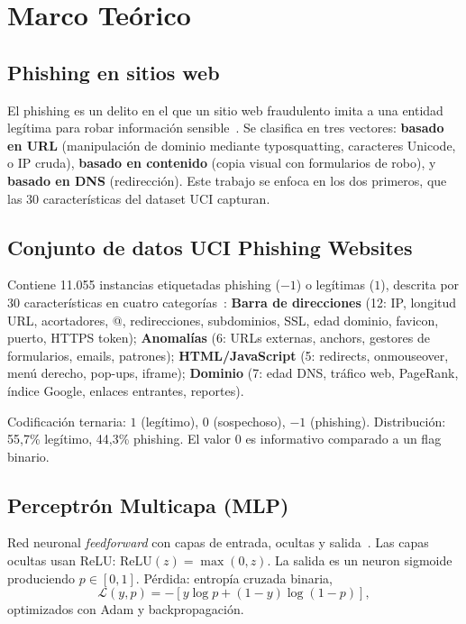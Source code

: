\documentclass[conference]{IEEEtran}
\begin{document}
\section{Marco Teórico}
\subsection{Phishing en sitios web}
El phishing es un delito en el que un sitio web fraudulento imita a una entidad legítima para robar información sensible~\cite{mohammad2012}. Se clasifica en tres vectores: \textbf{basado en URL} (manipulación de dominio mediante typosquatting, caracteres Unicode, o IP cruda), \textbf{basado en contenido} (copia visual con formularios de robo), y \textbf{basado en DNS} (redirección). Este trabajo se enfoca en los dos primeros, que las 30 características del dataset UCI capturan.

\subsection{Conjunto de datos UCI Phishing Websites}
Contiene 11.055 instancias etiquetadas phishing ($-1$) o legítimas ($1$), descrita por 30 características en cuatro categorías~\cite{mohammad2014}: \textbf{Barra de direcciones} (12: IP, longitud URL, acortadores, @, redirecciones, subdominios, SSL, edad dominio, favicon, puerto, HTTPS token); \textbf{Anomalías} (6: URLs externas, anchors, gestores de formularios, emails, patrones); \textbf{HTML/JavaScript} (5: redirects, onmouseover, menú derecho, pop-ups, iframe); \textbf{Dominio} (7: edad DNS, tráfico web, PageRank, índice Google, enlaces entrantes, reportes). 

Codificación ternaria: $1$ (legítimo), $0$ (sospechoso), $-1$ (phishing). Distribución: 55,7\% legítimo, 44,3\% phishing. El valor $0$ es informativo comparado a un flag binario.

\subsection{Perceptrón Multicapa (MLP)}
Red neuronal \textit{feedforward} con capas de entrada, ocultas y salida~\cite{lecun2015}. Las capas ocultas usan ReLU: $\text{ReLU}(z)=\max(0,z)$. La salida es un neuron sigmoide produciendo $p \in [0,1]$. Pérdida: entropía cruzada binaria,
\begin{equation}
\mathcal{L}(y,p) = -[y \log p + (1-y) \log(1-p)],
\end{equation}
optimizados con Adam y backpropagación.
\end{document}
